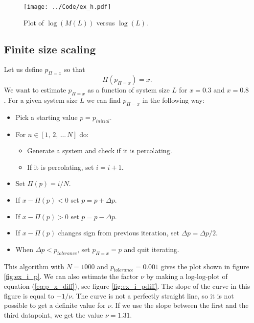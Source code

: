 \documentclass[12pt]{article}
\newcommand{\bdi}{\begin{displaymath}}
\newcommand{\edi}{\end{displaymath}}
\begin{document}
\begin{figure}[!ht]
    \begin{center}
	\texttt{[image: ../Code/ex\_h.pdf]}
	\caption{Plot of $\log(M(L))$ versus $\log(L)$.}
	\label{fig:ex_h}
    \end{center}
\end{figure}



\subsection*{Finite size scaling}
Let us define $p_{\Pi=x}$ so that
\bdi
\Pi(p_{\Pi=x}) = x.
\edi
We want to estimate $p_{\Pi=x}$ as a function of system size $L$ for $x=0.3$ and $x=0.8$. For a given system size $L$ we can find $p_{\Pi=x}$ in the following way:
\begin{itemize}
 \item Pick a starting value $p = p_{initial}$.
 \item For $n\in[1,\,2,\,\dots\,N]$ do:
   \begin{itemize}
     \item Generate a system and check if it is percolating.
     \item If it is percolating, set $i = i + 1$.
   \end{itemize}
 \item Set $\Pi(p) = i/N$.
 \item If $x - \Pi(p) < 0$ set $p = p + \Delta p$.
 \item If $x - \Pi(p) > 0$ set $p = p - \Delta p$.
 \item If $x - \Pi(p)$ changes sign from previous iteration, set $\Delta p = \Delta p/2$.
 \item When $\Delta p < p_{tolerance}$, set $p_{\Pi=x} = p$ and quit iterating.
\end{itemize}
This algorithm with $N=1000$ and $p_{tolerance} = 0.001$ gives the plot shown in figure \ref{fig:ex_i_p}. We can also estimate the factor $\nu$ by making a log-log-plot of equation (\ref{eq:p_x_diff}),
see figure \ref{fig:ex_i_pdiff}. The slope of the curve in this figure is equal to $-1/\nu$. The curve is not a perfectly straight line, so it is not possible to get a definite value for $\nu$. If we
use the slope between the first and the third datapoint, we get the value $\nu = 1.31$. 
\end{document}
